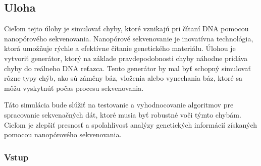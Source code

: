\subsection{Uloha}

Cieľom tejto úlohy je simulovať chyby, ktoré vznikajú pri čítaní DNA pomocou nanopórového sekvenovania.
Nanopórové sekvenovanie je inovatívna technológia, ktorá umožňuje rýchle a efektívne čítanie genetického materiálu. 
Úlohou je vytvoriť generátor, ktorý na základe pravdepodobnosti chyby náhodne pridáva chyby do reálneho DNA reťazca. Tento generátor by mal byť schopný simulovať rôzne typy chýb, ako sú záměny báz, vloženia alebo vynechania báz, ktoré sa môžu vyskytnúť počas procesu sekvenovania. 

Táto simulácia bude slúžiť na testovanie a vyhodnocovanie algoritmov pre spracovanie sekvenačných dát, ktoré musia byť robustné voči týmto chybám. Cieľom je zlepšiť presnosť a spoľahlivosť analýzy genetických informácií získaných pomocou nanopórového sekvenovania.

\subsubsection{Vstup}
